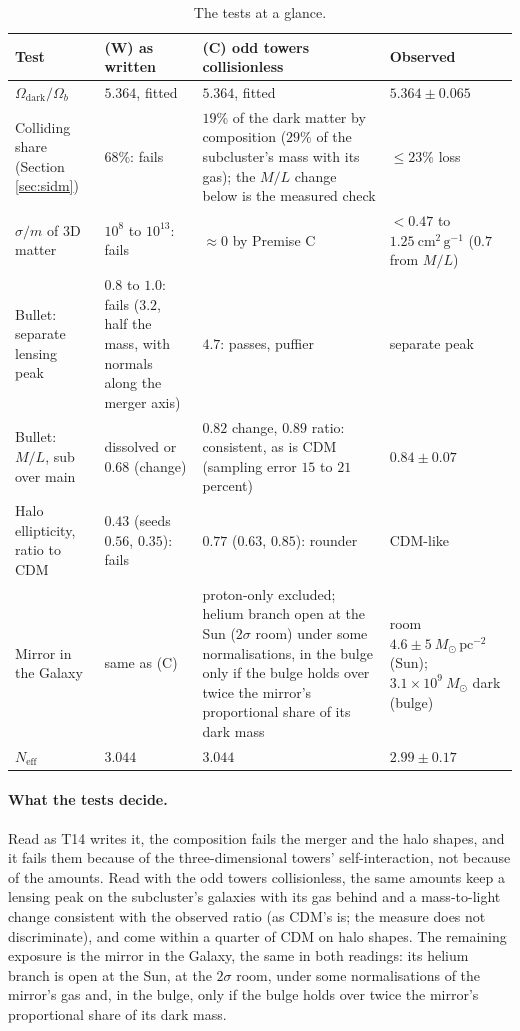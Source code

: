 \documentclass[11pt]{article}
\theoremstyle{definition}
\newcommand{\Msun}{M_{\odot}}
\newcommand{\cmg}{\mathrm{cm^{2}\,g^{-1}}}
\begin{document}
\begin{table}[htbp]\centering\small
\begin{tabular}{@{}>{\raggedright\arraybackslash}p{}>{\raggedright\arraybackslash}p{}>{\raggedright\arraybackslash}p{}>{\raggedright\arraybackslash}p{}@{}}
\toprule
Test & (W) as written & (C) odd towers collisionless & Observed \\
\midrule
$\Omega_{\mathrm{dark}}/\Omega_{b}$ & $5.364$, fitted & $5.364$, fitted & $5.364 \pm 0.065$ \\
Colliding share (Section \ref{sec:sidm}) & $68\%$: fails & $19\%$ of the dark matter by composition ($29\%$ of the subcluster's mass with its gas); the $M/L$ change below is the measured check & $\le 23\%$ loss \\
$\sigma/m$ of 3D matter & $10^{8}$ to $10^{13}$: fails & $\approx 0$ by Premise C & $< 0.47$ to $1.25\ \cmg$ ($0.7$ from $M/L$) \\
Bullet: separate lensing peak & $0.8$ to $1.0$: fails ($3.2$, half the mass, with normals along the merger axis) & $4.7$: passes, puffier & separate peak \\
Bullet: $M/L$, sub over main & dissolved or $0.68$ (change) & $0.82$ change, $0.89$ ratio: consistent, as is CDM (sampling error $15$ to $21$ percent) & $0.84 \pm 0.07$ \\
Halo ellipticity, ratio to CDM & $0.43$ (seeds $0.56$, $0.35$): fails & $0.77$ ($0.63$, $0.85$): rounder & CDM-like \\
Mirror in the Galaxy & same as (C) & proton-only excluded; helium branch open at the Sun ($2\sigma$ room) under some normalisations, in the bulge only if the bulge holds over twice the mirror's proportional share of its dark mass & room $4.6 \pm 5\ \Msun\,\mathrm{pc^{-2}}$ (Sun); $3.1 \times 10^{9}\ \Msun$ dark (bulge) \\
$N_{\mathrm{eff}}$ & $3.044$ & $3.044$ & $2.99 \pm 0.17$ \\
\bottomrule
\end{tabular}
\caption{The tests at a glance.}
\label{tab:glance}
\end{table}

\paragraph{What the tests decide.} Read as T14 writes it, the composition fails the merger and the halo shapes, and it fails them because of the three-dimensional towers' self-interaction, not because of the amounts. Read with the odd towers collisionless, the same amounts keep a lensing peak on the subcluster's galaxies with its gas behind and a mass-to-light change consistent with the observed ratio (as CDM's is; the measure does not discriminate), and come within a quarter of CDM on halo shapes. The remaining exposure is the mirror in the Galaxy, the same in both readings: its helium branch is open at the Sun, at the $2\sigma$ room, under some normalisations of the mirror's gas and, in the bulge, only if the bulge holds over twice the mirror's proportional share of its dark mass.
\end{document}
